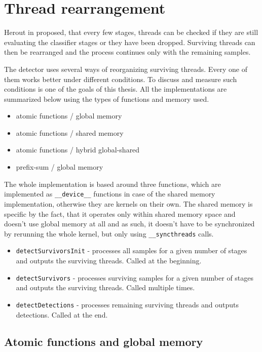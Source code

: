 \section{Thread rearrangement}\label{sec:impl-thread-rearrangement}

Herout in \cite{herout-realtime-cuda} proposed, that every few stages, threads can be checked if they are still evaluating the classifier stages or they have been dropped. Surviving threads can then be rearranged and the process continues only with the remaining samples.

The detector uses several ways of reorganizing surviving threads. Every one of them works better under different conditions. To discuss and measure such conditions is one of the goals of this thesis. All the implementations are summarized below using the types of functions and memory used.

\begin{itemize}
	\item atomic functions / global memory
	\item atomic functions / shared memory
	\item atomic functions / hybrid global-shared
	\item prefix-sum / global memory
\end{itemize}

The whole implementation is based around three functions, which are implemented as \verb|__device__| functions in case of the shared memory implementation, otherwise they are kernels on their own. The shared memory is specific by the fact, that it operates only within shared memory space and doesn't use global memory at all and as such, it doesn't have to be synchronized by rerunning the whole kernel, but only using \verb|__syncthreads| calls.

\begin{itemize}
	\item \verb|detectSurvivorsInit| - processes all samples for a given number of stages and outputs the surviving threads. Called at the beginning.
	\item \verb|detectSurvivors| - processes surviving samples for a given number of stages and outputs the surviving threads. Called multiple times.
	\item \verb|detectDetections| - processes remaining surviving threads and outputs detections. Called at the end.
\end{itemize}

\subsection{Atomic functions and global memory} \label{subsec:impl-global}

